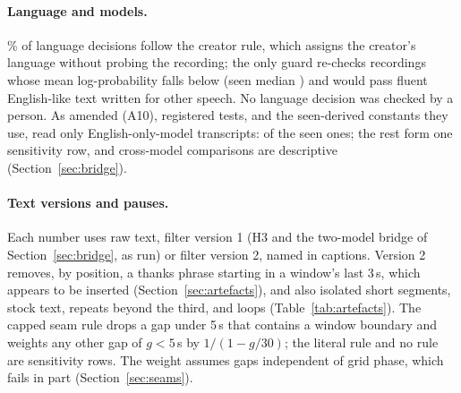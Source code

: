 \paragraph{Language and models.} \LangCreatorRulePct\% of language decisions follow the creator rule, which assigns
the creator's language without probing the recording; the only guard re-checks recordings whose mean log-probability
falls below \LogpGate{} (seen median \SeenLogpMedian) and would pass fluent English-like text written for other speech.
No language decision was checked by a person. As amended (A10), registered tests, and the seen-derived constants they
use, read only English-only-model transcripts: \NSeenEnglishOnly{} of the \NSeenFiles{} seen ones; the rest form one
sensitivity row, and cross-model comparisons are descriptive (Section~\ref{sec:bridge}).

\paragraph{Text versions and pauses.} Each number uses raw text, filter version 1 (H3 and the two-model bridge of
Section~\ref{sec:bridge}, as run) or
filter version 2, named in captions. Version 2 removes, by position, a thanks phrase starting in a window's last
3\,s, which appears to be inserted (Section~\ref{sec:artefacts}), and also isolated short segments, stock text, repeats
beyond the third, and loops (Table~\ref{tab:artefacts}). The capped seam rule drops a gap under 5\,s that contains a
window boundary and weights any other gap of $g<5$\,s by $1/(1-g/30)$; the literal rule and no rule are sensitivity
rows. The weight assumes gaps independent of grid phase, which fails in part (Section~\ref{sec:seams}).
